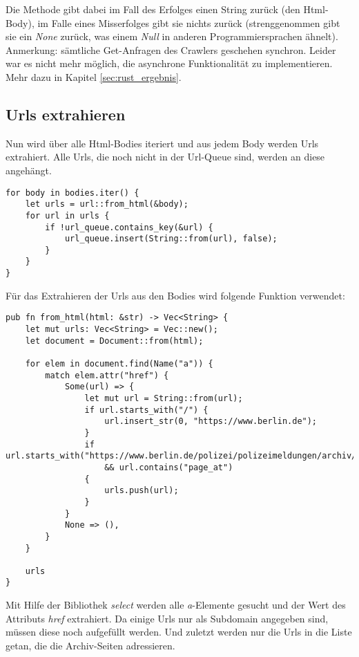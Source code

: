 Die Methode gibt dabei im Fall des Erfolges einen String zurück (den
Html-Body), im Falle eines Misserfolges gibt sie nichts zurück
(strenggenommen gibt sie ein \emph{None} zurück, was einem \emph{Null} in
anderen Programmiersprachen ähnelt).\\
Anmerkung: sämtliche Get-Anfragen des Crawlers geschehen synchron. Leider war es
nicht mehr möglich, die asynchrone Funktionalität zu implementieren. Mehr dazu
in Kapitel \ref{sec:rust_ergebnis}.


\subsection{Urls extrahieren}
Nun wird über alle Html-Bodies iteriert und aus jedem Body werden Urls
extrahiert. Alle Urls, die noch nicht in der Url-Queue sind, werden an diese
angehängt.

\begin{verbatim}
for body in bodies.iter() {
    let urls = url::from_html(&body);
    for url in urls {
        if !url_queue.contains_key(&url) {
            url_queue.insert(String::from(url), false);
        }
    }
}
\end{verbatim}

Für das Extrahieren der Urls aus den Bodies wird folgende Funktion verwendet:

\begin{verbatim}
pub fn from_html(html: &str) -> Vec<String> {
    let mut urls: Vec<String> = Vec::new();
    let document = Document::from(html);

    for elem in document.find(Name("a")) {
        match elem.attr("href") {
            Some(url) => {
                let mut url = String::from(url);
                if url.starts_with("/") {
                    url.insert_str(0, "https://www.berlin.de");
                }
                if url.starts_with("https://www.berlin.de/polizei/polizeimeldungen/archiv/20")
                    && url.contains("page_at")
                {
                    urls.push(url);
                }
            }
            None => (),
        }
    }

    urls
}
\end{verbatim}

Mit Hilfe der Bibliothek \emph{select} werden alle \emph{a}-Elemente gesucht
und der Wert des Attributs \emph{href} extrahiert. Da einige Urls nur als
Subdomain angegeben sind, müssen diese noch aufgefüllt werden. Und zuletzt
werden nur die Urls in die Liste getan, die die Archiv-Seiten adressieren.


